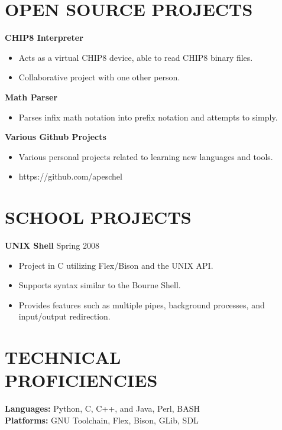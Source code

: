 \documentclass[10pt,line,margin]{res}
\begin{document}
\begin{resume}
\section {OPEN SOURCE PROJECTS}

    {\bf CHIP8 Interpreter}
    \begin{itemize} \itemsep -2pt
    \item Acts as a virtual CHIP8 device, able to read CHIP8 binary files.
    \item Collaborative project with one other person.
    \end{itemize}

    {\bf Math Parser}
    \begin{itemize} \itemsep -2pt
    \item Parses infix math notation into prefix notation and attempts to simply.
    \end{itemize}

    {\bf Various Github Projects}
    \begin{itemize} \itemsep -2pt
    \item Various personal projects related to learning new languages and tools.
    \item https://github.com/apeschel
    \end{itemize}

\section {SCHOOL PROJECTS}

    {\bf UNIX Shell} \hfill Spring 2008
    \begin{itemize} \itemsep -2pt
    \item Project in C utilizing Flex/Bison and the UNIX API.
    \item Supports syntax similar to the Bourne Shell.
    \item Provides features such as multiple pipes, background processes, and input/output redirection.
    \end{itemize}

\section{TECHNICAL \\ PROFICIENCIES}
    {\bf Languages:} Python, C, C++, and Java, Perl, BASH \\
    {\bf Platforms:} GNU Toolchain, Flex, Bison, GLib, SDL \\


\end{resume}
\end{document}

